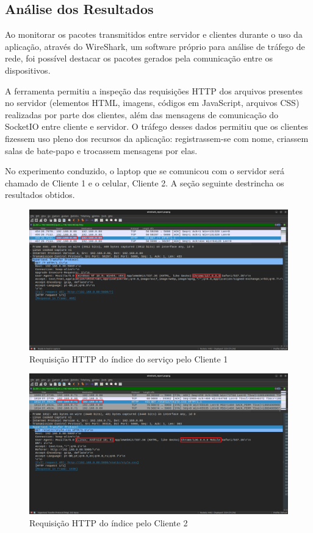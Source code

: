 \documentclass[conference,compsoc]{IEEEtran}
\begin{document}
\begin{otherlanguage}{brazil}
\subsection{Análise dos Resultados}

Ao monitorar os pacotes transmitidos entre servidor e clientes durante o uso da aplicação, através do WireShark, um software próprio para análise de tráfego de rede, foi possível destacar os pacotes gerados pela comunicação entre os dispositivos.

A ferramenta permitiu a inspeção das requisições HTTP dos arquivos presentes no servidor (elementos HTML, imagens, códigos em JavaScript, arquivos CSS) realizadas por parte dos clientes, além das mensagens de comunicação do SocketIO entre cliente e servidor. O tráfego desses dados permitiu que os clientes fizessem uso pleno dos recursos da aplicação: registrassem-se com nome, criassem salas de bate-papo e trocassem mensagens por elas.

No experimento conduzido, o laptop que se comunicou com o servidor será chamado de Cliente 1 e o celular, Cliente 2. A seção seguinte destrincha os resultados obtidos.

\begin{figure}[!h]
\centering
\includegraphics[width=\columnwidth]{../media/00-client0_app.png}
\caption{Requisição HTTP do índice do serviço pelo Cliente 1}
\label{fig:client1_request}
\end{figure}

\begin{figure}[!h]
\centering
\includegraphics[width=\columnwidth]{../media/01-client1_app.png}
\caption{Requisição HTTP do índice pelo Cliente 2}
\label{fig:client2_request}
\end{figure}


\end{otherlanguage}
\end{document}
